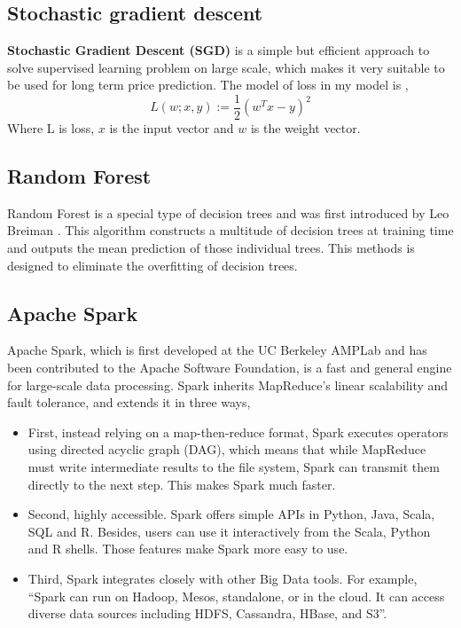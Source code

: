 \documentclass[12pt,a4paper]{scrartcl}
\begin{document}
	\subsection{Stochastic gradient descent}
	\textbf{Stochastic Gradient Descent (SGD)} is a simple but efficient approach to solve supervised learning problem on large scale\cite{bottou2010large}, which makes it very suitable to be used for long term price prediction. The model of loss in my model is \cite{spark_documentation},
	\begin{equation}
		\label{eq:SGD}
		L(w;x,y):=\frac{1}{2}(w^Tx-y)^2
	\end{equation}
	Where L is loss, $ x $ is the input vector and $ w $ is the weight vector.
	\subsection{Random Forest}
	Random Forest is a special type of decision trees and was first introduced by Leo Breiman \cite{breiman2001random}. This algorithm constructs a multitude of decision trees at training time and outputs the mean prediction of those individual trees. This methods is designed to eliminate the overfitting of decision trees.
	\subsection{Apache Spark}
	Apache Spark, which is first developed at the UC Berkeley AMPLab and has been contributed to the Apache Software Foundation, is a fast and general engine for large-scale data processing\cite{ryza2015advanced}. Spark inherits MapReduce's linear scalability and fault tolerance, and extends it in three ways,
	\begin{itemize}
		\item First, instead relying on a map-then-reduce format, Spark executes operators using directed acyclic graph (DAG), which means that while MapReduce must write intermediate results to the file system, Spark can transmit them directly to the next step. This makes Spark much faster.
		\item Second, highly accessible. Spark offers simple APIs in Python, Java, Scala, SQL and R. Besides, users can use it interactively from the Scala, Python and R shells. Those features make Spark more easy to use.
		\item Third, Spark integrates closely with other Big Data tools. For example, \enquote{Spark can run on Hadoop, Mesos, standalone, or in the cloud. It can access diverse data sources including HDFS, Cassandra, HBase, and S3}\cite{apache_spark}.
	\end{itemize}
\end{document}
